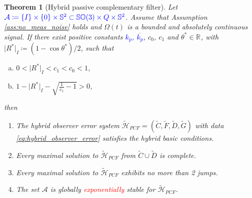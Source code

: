 \documentclass{article}
\newcommand{\SOthree}{\mathbb{SO}(3)}
\newcommand{\R}[1]{\mathbb{R}^{#1}}
\newtheorem{theorem}{Theorem}
\newcommand{\textblue}[1]{\textcolor{blue}{#1}}
\newcommand{\normSOthree}[1]{{{\vert}#1 {\vert}_I}}
\newcommand{\Rstar}{{R^*}}
\begin{document}
\begin{theorem}[Hybrid passive complementary filter]\label{theorem:main}
    Let $\textblue{\mathcal{A}\coloneqq \{I\}\times \{0\}\times \mathbb{S}^2 \subset \SOthree\times Q\times \mathbb{S}^2}$. Assume that Assumption \ref{ass:no_meas_noise} holds and $\Omega(t)$ is a bounded and absolutely continuous signal. If there exist positive constants \textblue{$k_p$, $\overline{k_p}$}, $c_0$, $c_1$ and  $\theta^*\in \R{}$, with $\normSOthree{\Rstar}\coloneqq (1-\cos\theta^*)/2$, such that 
        \begin{enumerate}[(a)]
        \item $0 < \normSOthree{\Rstar} < c_1 < c_0 < 1$,\label{item:a-bullet}
        \item $1 - \normSOthree{\Rstar}- \sqrt{\frac{1}{c_1}-1} > 0$, \label{item:b-bullet}
        \end{enumerate}
    \begingroup
    \renewcommand\labelenumi{(\theenumi)}
    then
    \begin{enumerate}
        \item \label{(1)}The hybrid observer error system $\tilde{\mathcal{H}}_{PCF} = (\tilde{C}, \tilde{F}, \tilde{D}, \tilde{G})$ with data \eqref{eq:hybrid_observer_error} satisfies the hybrid basic conditions.
        \item \label{(2)}Every maximal solution to $\tilde{\mathcal{H}}_{PCF}$ from $\tilde{C}\cup \tilde{D}$ is complete.
        \item \label{(3)} Every maximal solution to $\tilde{\mathcal{H}}_{PCF}$ exhibits no more than 2 jumps. 
        \item \label{(4)}The set $\mathcal{A}$ is globally \textcolor{red}{exponentially} stable for $\tilde{\mathcal{H}}_{PCF}$. 
    \end{enumerate}
    \endgroup
    \end{theorem}
\end{document}
